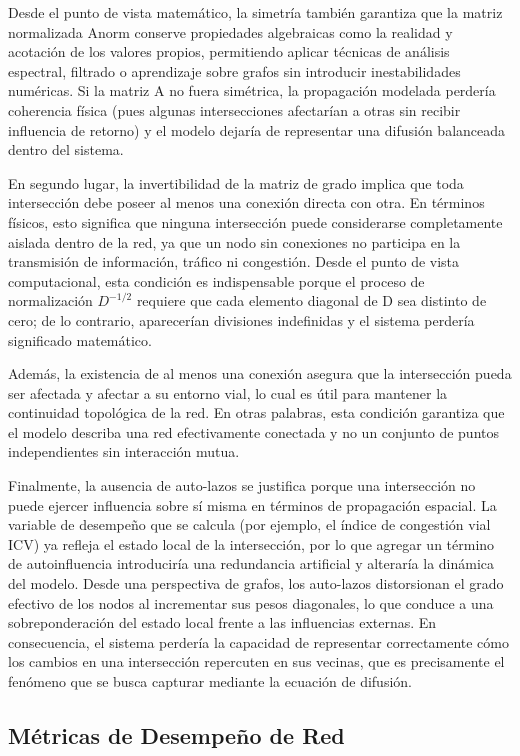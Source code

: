 \documentclass[12pt,a4paper,oneside]{report}
\begin{document}
Desde el punto de vista matemático, la simetría también garantiza que la matriz normalizada Anorm conserve propiedades algebraicas como la realidad y acotación de los valores propios, permitiendo aplicar técnicas de análisis espectral, filtrado o aprendizaje sobre grafos sin introducir inestabilidades numéricas. Si la matriz A no fuera simétrica, la propagación modelada perdería coherencia física (pues algunas intersecciones afectarían a otras sin recibir influencia de retorno) y el modelo dejaría de representar una difusión balanceada dentro del sistema.

En segundo lugar, la invertibilidad de la matriz de grado implica que toda intersección debe poseer al menos una conexión directa con otra. En términos físicos, esto significa que ninguna intersección puede considerarse completamente aislada dentro de la red, ya que un nodo sin conexiones no participa en la transmisión de información, tráfico ni congestión. Desde el punto de vista computacional, esta condición es indispensable porque el proceso de normalización \(D^{- 1/2}\) requiere que cada elemento diagonal de D sea distinto de cero; de lo contrario, aparecerían divisiones indefinidas y el sistema perdería significado matemático.

Además, la existencia de al menos una conexión asegura que la intersección pueda ser afectada y afectar a su entorno vial, lo cual es útil para mantener la continuidad topológica de la red. En otras palabras, esta condición garantiza que el modelo describa una red efectivamente conectada y no un conjunto de puntos independientes sin interacción mutua.

Finalmente, la ausencia de auto-lazos se justifica porque una intersección no puede ejercer influencia sobre sí misma en términos de propagación espacial. La variable de desempeño que se calcula (por ejemplo, el índice de congestión vial ICV) ya refleja el estado local de la intersección, por lo que agregar un término de autoinfluencia introduciría una redundancia artificial y alteraría la dinámica del modelo. Desde una perspectiva de grafos, los auto-lazos distorsionan el grado efectivo de los nodos al incrementar sus pesos diagonales, lo que conduce a una sobreponderación del estado local frente a las influencias externas. En consecuencia, el sistema perdería la capacidad de representar correctamente cómo los cambios en una intersección repercuten en sus vecinas, que es precisamente el fenómeno que se busca capturar mediante la ecuación de difusión.

\subsection{Métricas de Desempeño de Red}\label{muxe9tricas-de-desempeuxf1o-de-red}
\end{document}
